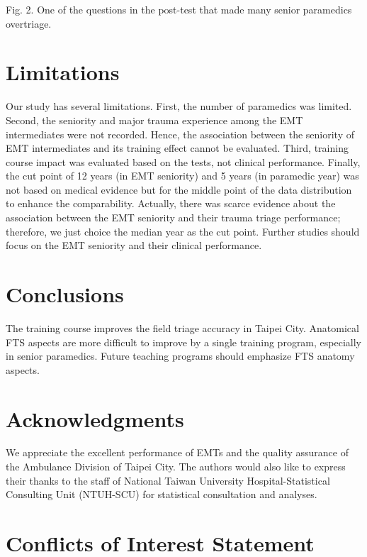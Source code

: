 \documentclass[
  20pt
]{article}
\begin{document}
\begin{multicols}{2}
Fig. 2. One of the questions in the post-test that made many senior
paramedics overtriage.

\hypertarget{limitations}{%
\section{Limitations}\label{limitations}}

Our study has several limitations. First, the number of paramedics was
limited. Second, the seniority and major trauma experience among the EMT
intermediates were not recorded. Hence, the association between the
seniority of EMT intermediates and its training effect cannot be
evaluated. Third, training course impact was evaluated based on the
tests, not clinical performance. Finally, the cut point of 12 years (in
EMT seniority) and 5 years (in paramedic year) was not based on medical
evidence but for the middle point of the data distribution to enhance
the comparability. Actually, there was scarce evidence about the
association between the EMT seniority and their trauma triage
performance; therefore, we just choice the median year as the cut point.
Further studies should focus on the EMT seniority and their clinical
performance.

\hypertarget{conclusions}{%
\section{Conclusions}\label{conclusions}}

The training course improves the field triage accuracy in Taipei City.
Anatomical FTS aspects are more difficult to improve by a single
training program, especially in senior paramedics. Future teaching
programs should emphasize FTS anatomy aspects.

\hypertarget{acknowledgments}{%
\section{Acknowledgments}\label{acknowledgments}}

We appreciate the excellent performance of EMTs and the quality
assurance of the Ambulance Division of Taipei City. The authors would
also like to express their thanks to the staff of National Taiwan
University Hospital-Statistical Consulting Unit (NTUH-SCU) for
statistical consultation and analyses.

\hypertarget{conflicts-of-interest-statement}{%
\section{Conflicts of Interest
Statement}\label{conflicts-of-interest-statement}}


\end{multicols}
\end{document}
